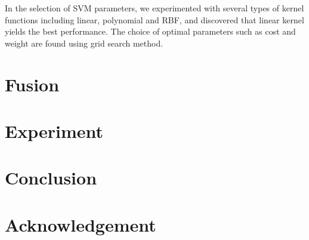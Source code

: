 \documentclass[10pt,twocolumn,letterpaper]{article}
\begin{document}
In the selection of SVM parameters, we experimented with several types of kernel functions including linear, polynomial and RBF, and discovered that linear kernel yields the best performance. The choice of optimal parameters such as cost and weight are found using grid search method.

\section{Fusion}

\section{Experiment}

\section{Conclusion}

\section{Acknowledgement}

{\small


}
\end{document}
